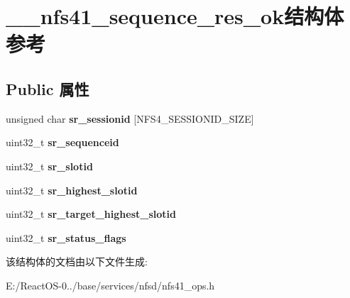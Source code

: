 \hypertarget{struct____nfs41__sequence__res__ok}{}\section{\+\_\+\+\_\+nfs41\+\_\+sequence\+\_\+res\+\_\+ok结构体 参考}
\label{struct____nfs41__sequence__res__ok}
\subsection*{Public 属性}
\begin{DoxyCompactItemize}
\item 
\mbox{\label{struct____nfs41__sequence__res__ok_a85cb45d12bb0986a52b1e05f5d1e06b2}} 
unsigned char {\bfseries sr\+\_\+sessionid} \mbox{[}N\+F\+S4\+\_\+\+S\+E\+S\+S\+I\+O\+N\+I\+D\+\_\+\+S\+I\+ZE\mbox{]}
\item 
\mbox{\label{struct____nfs41__sequence__res__ok_adca800b278ef748f15967677cfafc1a2}} 
uint32\+\_\+t {\bfseries sr\+\_\+sequenceid}
\item 
\mbox{\label{struct____nfs41__sequence__res__ok_ab90f92ddea623f0a9b9b8700c6ce1bbe}} 
uint32\+\_\+t {\bfseries sr\+\_\+slotid}
\item 
\mbox{\label{struct____nfs41__sequence__res__ok_aecc001b6605191aa0a36070fd0a6e380}} 
uint32\+\_\+t {\bfseries sr\+\_\+highest\+\_\+slotid}
\item 
\mbox{\label{struct____nfs41__sequence__res__ok_ad709231d458378630fd8b22b01091a9f}} 
uint32\+\_\+t {\bfseries sr\+\_\+target\+\_\+highest\+\_\+slotid}
\item 
\mbox{\label{struct____nfs41__sequence__res__ok_ab20cb0b76e345e78d4e8214b49fcd514}} 
uint32\+\_\+t {\bfseries sr\+\_\+status\+\_\+flags}
\end{DoxyCompactItemize}


该结构体的文档由以下文件生成\+:\begin{DoxyCompactItemize}
\item 
E\+:/\+React\+O\+S-\/0../base/services/nfsd/nfs41\+\_\+ops.\+h\end{DoxyCompactItemize}
